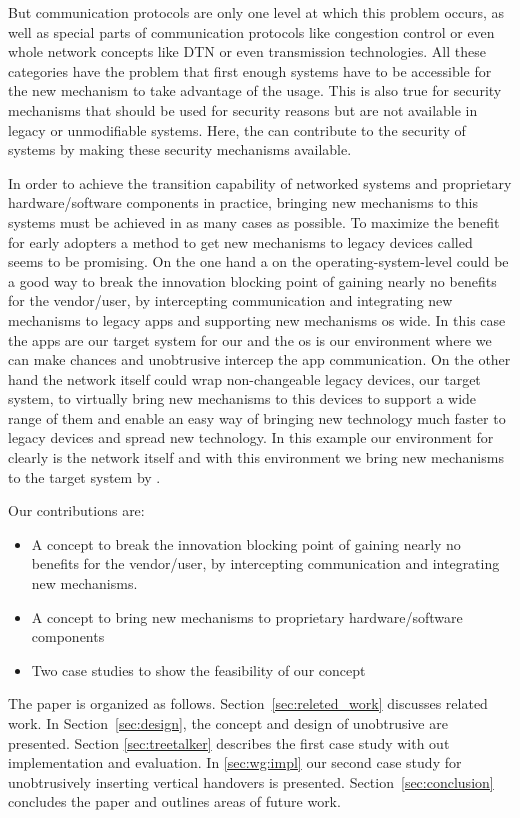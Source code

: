 But communication protocols are only one level at which this problem occurs, as well as special parts of communication protocols like congestion control or even whole network concepts like DTN or even transmission technologies. 
All these categories have the problem that first enough systems have to be accessible for the new mechanism to take advantage of the usage. 
This is also true for security mechanisms that should be used for security reasons but are not available in legacy or unmodifiable systems. 
Here, the \mm can contribute to the security of systems by making these security mechanisms available.

In order to achieve the transition capability of networked systems and proprietary hardware/software components in practice, bringing new mechanisms to this systems must be achieved in as many cases as possible. 
To maximize the benefit for early adopters a method to get new mechanisms to legacy devices called  \mm seems to be promising.
On the one hand a \mm on the operating-system-level could be a good way to break the innovation blocking point of gaining nearly no benefits for the vendor/user, by intercepting communication and integrating new mechanisms to legacy apps and supporting new mechanisms os wide.
In this case the apps are our target system for our \mm and the os is our environment where we can make chances and unobtrusive intercep the app communication.
On the other hand the network itself could wrap non-changeable legacy devices, our target system, to virtually bring new mechanisms to this devices to support a wide range of them and enable an easy way of bringing new technology much faster to legacy devices and spread new technology. 
In this example our environment for \mm clearly is the network itself and with this environment we bring new mechanisms to the target system by \mm. 


% 
% 


Our contributions are:

\begin{itemize}
 \item A concept to break the innovation blocking point of gaining nearly no benefits for the vendor/user, by intercepting communication and integrating new mechanisms.
 \item A concept to bring new mechanisms to proprietary hardware/software components
 \item Two case studies to show the feasibility of our concept 
\end{itemize}

The paper is organized as follows. 
Section~\ref{sec:releted_work} discusses related work.
In Section~\ref{sec:design}, the concept and design of unobtrusive \mm are presented.
Section \ref{sec:treetalker} describes the first case study with out \ttt implementation and evaluation. 
In \ref{sec:wg:impl} our second case study for unobtrusively inserting vertical handovers is presented. 
Section~\ref{sec:conclusion} concludes the paper and outlines areas of future work.